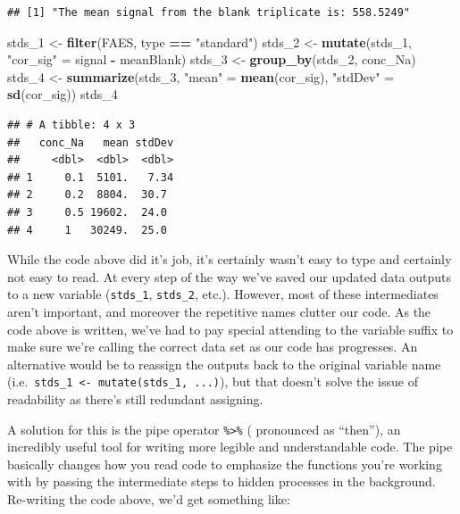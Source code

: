 \documentclass[
]{book}
\newenvironment{Shaded}{\begin{snugshade}}{\end{snugshade}}
\newcommand{\FunctionTok}[1]{\textcolor[rgb]{0.13,0.29,0.53}{\textbf{#1}}}
\newcommand{\NormalTok}[1]{#1}
\newcommand{\OtherTok}[1]{\textcolor[rgb]{0.56,0.35,0.01}{#1}}
\newcommand{\SpecialCharTok}[1]{\textcolor[rgb]{0.81,0.36,0.00}{\textbf{#1}}}
\newcommand{\StringTok}[1]{\textcolor[rgb]{0.31,0.60,0.02}{#1}}
\begin{document}
\begin{verbatim}
## [1] "The mean signal from the blank triplicate is: 558.5249"
\end{verbatim}

\begin{Shaded}
\begin{Highlighting}[]
\NormalTok{stds\_1 }\OtherTok{\textless{}{-}} \FunctionTok{filter}\NormalTok{(FAES, type }\SpecialCharTok{==} \StringTok{"standard"}\NormalTok{)}
\NormalTok{stds\_2 }\OtherTok{\textless{}{-}} \FunctionTok{mutate}\NormalTok{(stds\_1, }\StringTok{"cor\_sig"} \OtherTok{=}\NormalTok{ signal }\SpecialCharTok{{-}}\NormalTok{ meanBlank)}
\NormalTok{stds\_3 }\OtherTok{\textless{}{-}} \FunctionTok{group\_by}\NormalTok{(stds\_2, conc\_Na)}
\NormalTok{stds\_4 }\OtherTok{\textless{}{-}} \FunctionTok{summarize}\NormalTok{(stds\_3, }\StringTok{"mean"} \OtherTok{=} \FunctionTok{mean}\NormalTok{(cor\_sig), }\StringTok{"stdDev"} \OtherTok{=} \FunctionTok{sd}\NormalTok{(cor\_sig))}
\NormalTok{stds\_4}
\end{Highlighting}
\end{Shaded}

\begin{verbatim}
## # A tibble: 4 x 3
##   conc_Na   mean stdDev
##     <dbl>  <dbl>  <dbl>
## 1     0.1  5101.   7.34
## 2     0.2  8804.  30.7 
## 3     0.5 19602.  24.0 
## 4     1   30249.  25.0
\end{verbatim}

While the code above did it's job, it's certainly wasn't easy to type and certainly not easy to read. At every step of the way we've saved our updated data outputs to a new variable (\texttt{stds\_1}, \texttt{stds\_2}, etc.). However, most of these intermediates aren't important, and moreover the repetitive names clutter our code. As the code above is written, we've had to pay special attending to the variable suffix to make sure we're calling the correct data set as our code has progresses. An alternative would be to reassign the outputs back to the original variable name (i.e.~\texttt{stds\_1\ \textless{}-\ mutate(stds\_1,\ ...)}), but that doesn't solve the issue of readability as there's still redundant assigning.

A solution for this is the pipe operator \texttt{\%\textgreater{}\%} ( pronounced as ``then''), an incredibly useful tool for writing more legible and understandable code. The pipe basically changes how you read code to emphasize the functions you're working with by passing the intermediate steps to hidden processes in the background. Re-writing the code above, we'd get something like:
\end{document}
